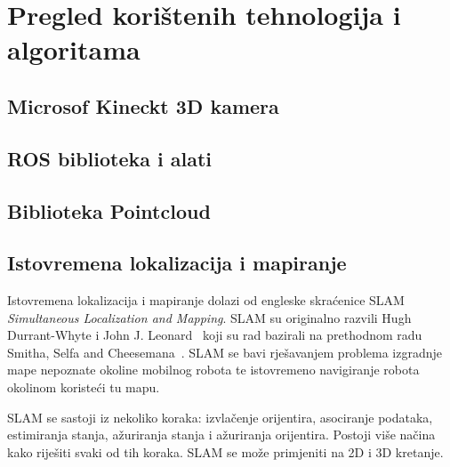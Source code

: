 \newpage
\setcounter{figure}{0}

\section{Pregled korištenih tehnologija i algoritama} %
\label{sec:Tehnologija i teorija}


\subsection{Microsof Kineckt 3D kamera} %
\label{sub:Microsof Kineckt 3D kamera}


\subsection{ROS biblioteka i alati} %
\label{sub:ROS biblioteka i alati}


\subsection{Biblioteka Pointcloud} %
\label{sub:Biblioteka Pointcloud}



\newpage
\subsection{Istovremena lokalizacija i mapiranje} %
\label{sub:Slam}
Istovremena lokalizacija i mapiranje dolazi od engleske skraćenice
SLAM \textit{Simultaneous Localization and Mapping}. SLAM su
originalno razvili Hugh Durrant-Whyte i John J.
Leonard~\cite{Durrant:91b} koji su rad bazirali na prethodnom radu
Smitha, Selfa and Cheesemana~\cite{Smith86}. SLAM se bavi rješavanjem
problema izgradnje mape nepoznate okoline mobilnog robota te istovremeno
navigiranje robota okolinom koristeći tu mapu.

SLAM se sastoji iz nekoliko koraka: izvlačenje orijentira, asociranje
podataka, estimiranja stanja, ažuriranja stanja i ažuriranja orijentira.
Postoji više načina kako riješiti svaki od tih koraka. SLAM se može
primjeniti na 2D i 3D kretanje.


